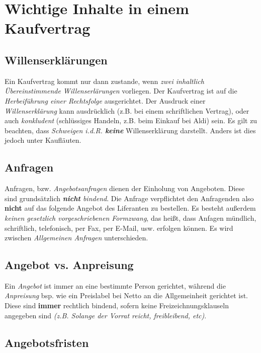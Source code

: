 \documentclass[a4paper, 12pt]{report}
\begin{document}
\section{Wichtige Inhalte in einem Kaufvertrag}

\subsection{Willenserklärungen}

Ein Kaufvertrag kommt nur dann zustande, wenn \emph{zwei inhaltlich
Übereinstimmende Willenserlärungen} vorliegen. Der Kaufvertrag ist auf die
\emph{Herbeiführung einer Rechtsfolge} ausgerichtet. Der Ausdruck einer
\emph{Willenserklärung} kann ausdrücklich (z.B. bei einem schriftlichen
Vertrag), oder auch \emph{konkludent} (schlüssiges Handeln, z.B. beim Einkauf
bei Aldi) sein. Es gilt zu beachten, dass \emph{Schweigen i.d.R. \textbf{keine}}
Willenserklärung darstellt. Anders ist dies jedoch unter Kaufläuten. \\

\subsection{Anfragen}

Anfragen, bzw. \emph{Angebotsanfragen} dienen der Einholung von Angeboten. Diese
sind grundsätzlich \emph{\textbf{nicht} bindend}. Die Anfrage verpflichtet den
Anfragenden also \textbf{nicht} auf das folgende Angebot des Liferanten zu
bestellen. Es besteht außerdem \emph{keinen gesetzlich vorgeschriebenen
Formzwang}, das heißt, dass Anfagen mündlich, schriftlich, telefonisch, per Fax,
per E-Mail, usw. erfolgen können. Es wird zwischen \emph{Allgemeinen Anfragen}
unterschieden. \\

\subsection{Angebot vs. Anpreisung}

Ein \emph{Angebot} ist immer an eine bestimmte Person gerichtet, während die
\emph{Anpreisung} bsp. wie ein Preislabel bei Netto an die Allgemeinheit
gerichtet ist. Diese sind \textbf{immer} rechtlich bindend, sofern keine
Freizeichnungsklauseln angegeben sind \emph{(z.B. \glqq Solange der Vorrat
reicht\grqq{}, \glqq freibleibend\grqq{}, etc)}.

\subsection{Angebotsfristen}
\end{document}
